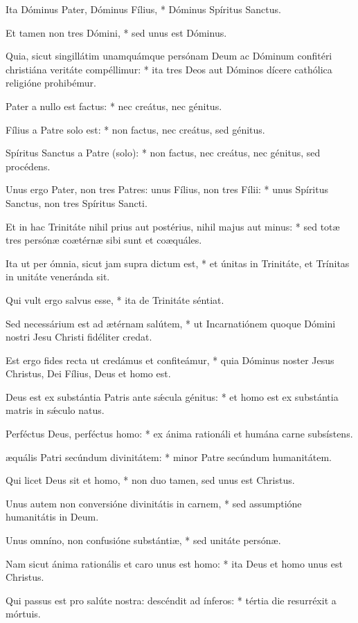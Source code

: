 {Ita Dóminus Pater, Dóminus Fílius, * Dóminus Spíritus Sanctus.\par
Et tamen non tres Dómini, * sed unus est Dóminus.\par
Quia, sicut singillátim unamquámque persónam Deum ac Dóminum confitéri christiána veritáte compéllimur: * ita tres Deos aut Dóminos dícere cathólica religióne prohibémur.\par
Pater a nullo est factus: * nec creátus, nec génitus.\par
Fílius a Patre solo est: * non factus, nec creátus, sed génitus.\par
Spíritus Sanctus a Patre (solo): * non factus, nec creátus, nec génitus, sed procédens.\par
Unus ergo Pater, non tres Patres: unus Fílius, non tres Fílii: * unus Spíritus Sanctus, non tres Spíritus Sancti.\par
Et in hac Trinitáte nihil prius aut postérius, nihil majus aut minus: * sed tot{\ae} tres persón{\ae} co{\ae}térn{\ae} sibi sunt et co{\ae}quáles.\par
Ita ut per ómnia, sicut jam supra dictum est, * et únitas in Trinitáte, et Trínitas in unitáte veneránda sit.\par
Qui vult ergo salvus esse, * ita de Trinitáte séntiat.
\par
Sed necessárium est ad {\ae}térnam salútem, * ut Incarnatiónem quoque Dómini nostri Jesu Christi fidéliter credat.\par
Est ergo fides recta ut credámus et confiteámur, * quia Dóminus noster Jesus Christus, Dei Fílius, Deus et homo est.\par
Deus est ex substántia Patris ante sǽcula génitus: * et homo est ex substántia matris in sǽculo natus.\par
Perféctus Deus, perféctus homo: * ex ánima rationáli et humána carne subsístens.\par
{\ae}quális Patri secúndum divinitátem: * minor Patre secúndum humanitátem.\par
Qui licet Deus sit et homo, * non duo tamen, sed unus est Christus.\par
Unus autem non conversióne divinitátis in carnem, * sed assumptióne humanitátis in Deum.\par
Unus omníno, non confusióne substánti{\ae}, * sed unitáte persón{\ae}.\par
Nam sicut ánima rationális et caro unus est homo: * ita Deus et homo unus est Christus.\par
Qui passus est pro salúte nostra: descéndit ad ínferos: * tértia die resurréxit a mórtuis.\par
}
